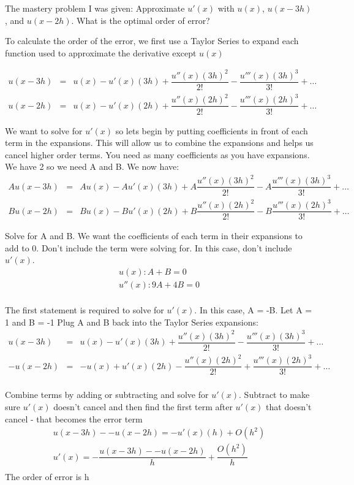 \documentclass{article}
\newcommand{\bea}{\begin{eqnarray*}}
\newcommand{\eea}{\end{eqnarray*}}
\begin{document}
The mastery problem I was given: Approximate $u'(x)$ with $u(x)$, $u(x-3h)$, and $u(x-2h)$. What is the optimal order of error? \newline

To calculate the order of the error, we first use a Taylor Series to expand each function used to approximate the derivative except $u(x)$

\bea
u(x-3h) &=& u(x) - u'(x)(3h) + \dfrac{u''(x)(3h)^2}{2!} -  \dfrac{u'''(x)(3h)^3}{3!}+\ldots \\
u(x-2h) &=& u(x) - u'(x)(2h) + \dfrac{u''(x)(2h)^2}{2!} - \dfrac{u'''(x)(2h)^3}{3!}+\ldots
\eea

We want to solve for $u'(x)$ so lets begin by putting coefficients in front of each term in the expansions. This will allow us to combine the expansions and helps us cancel higher order terms. You need as many coefficients as you have expansions. We have 2 so we need A and B.\newline
We now have: \newline
\bea
Au(x-3h) &=& Au(x) - Au'(x)(3h) + A\dfrac{u''(x)(3h)^2}{2!} -  A\dfrac{u'''(x)(3h)^3}{3!}+\ldots \\
Bu(x-2h) &=& Bu(x) - Bu'(x)(2h) + B\dfrac{u''(x)(2h)^2}{2!} - B\dfrac{u'''(x)(2h)^3}{3!}+\ldots
\eea

Solve for A and B. We want the coefficients of each term in their expansions to add to 0. Don't include the term were solving for. In this case, don't include $u'(x)$. \newline
\bea
u(x): A + B = 0 \\
u''(x): 9A + 4B = 0 \\
\eea

The first statement is required to solve for $u'(x)$. In this case, A = -B. Let A = 1 and B = -1
Plug A and B back into the Taylor Series expansions:
\bea
u(x-3h) &=& u(x) - u'(x)(3h) + \dfrac{u''(x)(3h)^2}{2!} -  \dfrac{u'''(x)(3h)^3}{3!}+\ldots  \\
-u(x-2h) &=& -u(x) + u'(x)(2h) - \dfrac{u''(x)(2h)^2}{2!}  +\dfrac{u'''(x)(2h)^3}{3!}+\ldots  \\
\eea

Combine terms by adding or subtracting and solve for $u'(x)$. Subtract to make sure $u'(x)$ doesn't cancel and then find the first term after $u'(x)$ that doesn't cancel - that becomes the error term  \newline
\bea
u(x-3h) - -u(x-2h) = -u'(x)(h) + O(h^2) \\ 
u'(x) = -\dfrac{u(x-3h) - -u(x-2h)}{h} + \dfrac{O(h^2)}{h} \\
\eea
The order of error is h 
\newline
\end{document}
